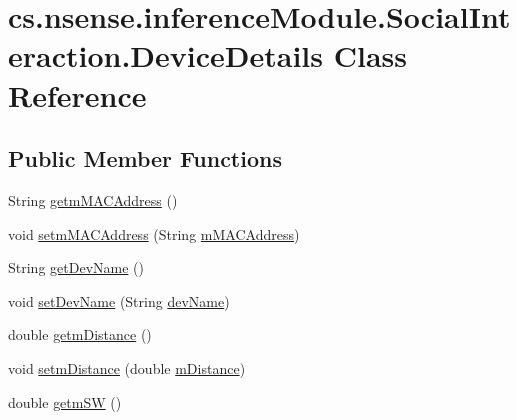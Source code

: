 \hypertarget{classcs_1_1nsense_1_1inference_module_1_1_social_interaction_1_1_device_details}{\section{cs.\-nsense.\-inference\-Module.\-Social\-Interaction.\-Device\-Details Class Reference}
\label{classcs_1_1nsense_1_1inference_module_1_1_social_interaction_1_1_device_details}
}
\subsection*{Public Member Functions}
\begin{DoxyCompactItemize}
\item 
String \hyperlink{classcs_1_1nsense_1_1inference_module_1_1_social_interaction_1_1_device_details_a04e75731fb14bb9b3a8c1e94c6b2e121}{getm\-M\-A\-C\-Address} ()
\item 
void \hyperlink{classcs_1_1nsense_1_1inference_module_1_1_social_interaction_1_1_device_details_a7f22ee80a79992acfe962b14c932f1e8}{setm\-M\-A\-C\-Address} (String \hyperlink{classcs_1_1nsense_1_1inference_module_1_1_social_interaction_1_1_device_details_a48377283d98c2c51e87c4720bbad9063}{m\-M\-A\-C\-Address})
\item 
String \hyperlink{classcs_1_1nsense_1_1inference_module_1_1_social_interaction_1_1_device_details_a41a0d3a5b1af96b4385c9a9e3ebd0a31}{get\-Dev\-Name} ()
\item 
void \hyperlink{classcs_1_1nsense_1_1inference_module_1_1_social_interaction_1_1_device_details_a79920ac4a75aff4adc156515ab20c43d}{set\-Dev\-Name} (String \hyperlink{classcs_1_1nsense_1_1inference_module_1_1_social_interaction_1_1_device_details_abae55da3f92cedbea10c2ed2c0b65061}{dev\-Name})
\item 
double \hyperlink{classcs_1_1nsense_1_1inference_module_1_1_social_interaction_1_1_device_details_a1fdc494f6f8cbf9eb90061398908d524}{getm\-Distance} ()
\item 
void \hyperlink{classcs_1_1nsense_1_1inference_module_1_1_social_interaction_1_1_device_details_a0e56437e96b3266b58116cb4a8c7e715}{setm\-Distance} (double \hyperlink{classcs_1_1nsense_1_1inference_module_1_1_social_interaction_1_1_device_details_acb7dbaa686bf2b2605bf93a89f4e3feb}{m\-Distance})
\item 
double \hyperlink{classcs_1_1nsense_1_1inference_module_1_1_social_interaction_1_1_device_details_a82ac6471adc0f198286a41897dea0a10}{getm\-S\-W} ()

\end{DoxyCompactItemize}
